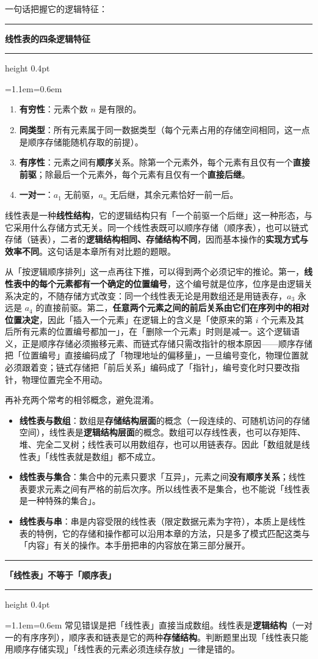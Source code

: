 \documentclass[11pt,openany,UTF8]{ctexbook}
\newcommand{\callouthead}[2]{%
  \par\addvspace{7pt}\noindent
  {\color{#1}\rule[-0.15em]{3pt}{1.05em}}\hspace{0.5em}%
  {\bfseries\color{#1}#2}\par\nobreak\vspace{-0.35em}%
  {\color{rulesep}\hrule height 0.4pt}\nobreak\vspace{0.45em}%
  \begingroup\small\setlength{\parindent}{0pt}%
  \leftskip=1.1em\rightskip=0.6em\noindent\ignorespaces}
\newcommand{\calloutend}{\par\endgroup\addvspace{7pt}}
\newenvironment{callkey}[1]{\callouthead{keybar}{#1}}{\calloutend}
\newenvironment{callwarn}[1]{\callouthead{warnbar}{#1}}{\calloutend}
\begin{document}
一句话把握它的逻辑特征：

\begin{callkey}{线性表的四条逻辑特征}
\begin{enumerate}
\item \textbf{有穷性}：元素个数 $n$ 是有限的。
\item \textbf{同类型}：所有元素属于同一数据类型（每个元素占用的存储空间相同，这一点是顺序存储能随机存取的前提）。
\item \textbf{有序性}：元素之间有\textbf{顺序}关系。除第一个元素外，每个元素有且仅有一个\textbf{直接前驱}；除最后一个元素外，每个元素有且仅有一个\textbf{直接后继}。
\item \textbf{一对一}：$a_1$ 无前驱，$a_n$ 无后继，其余元素恰好一前一后。
\end{enumerate}
\end{callkey}

线性表是一种\textbf{线性结构}，它的逻辑结构只有「一个前驱一个后继」这一种形态，与它采用什么存储方式无关。同一个线性表既可以顺序存储（顺序表），也可以链式存储（链表），二者的\textbf{逻辑结构相同、存储结构不同}，因而基本操作的\textbf{实现方式与效率不同}。这句话是本章所有对比题的题眼。

从「按逻辑顺序排列」这一点再往下推，可以得到两个必须记牢的推论。第一，\textbf{线性表中的每个元素都有一个确定的位置编号}，这个编号就是位序，位序是由逻辑关系决定的，不随存储方式改变：同一个线性表无论是用数组还是用链表存，$a_3$ 永远是 $a_4$ 的直接前驱。第二，\textbf{任意两个元素之间的前后关系由它们在序列中的相对位置决定}，因此「插入一个元素」在逻辑上的含义是「使原来的第 $i$ 个元素及其后所有元素的位置编号都加一」，在「删除一个元素」时则是减一。这个逻辑语义，正是顺序存储必须搬移元素、而链式存储只需改指针的根本原因——顺序存储把「位置编号」直接编码成了「物理地址的偏移量」，一旦编号变化，物理位置就必须跟着变；链式存储把「前后关系」编码成了「指针」，编号变化时只要改指针，物理位置完全不用动。

再补充两个常考的相邻概念，避免混淆。

\begin{itemize}
\item \textbf{线性表与数组}：数组是\textbf{存储结构层面}的概念（一段连续的、可随机访问的存储空间），线性表是\textbf{逻辑结构层面}的概念。数组可以存线性表，也可以存矩阵、堆、完全二叉树；线性表可以用数组存，也可以用链表存。因此「数组就是线性表」「线性表就是数组」都不成立。
\item \textbf{线性表与集合}：集合中的元素只要求「互异」，元素之间\textbf{没有顺序关系}；线性表要求元素之间有严格的前后次序。所以线性表不是集合，也不能说「线性表是一种特殊的集合」。
\item \textbf{线性表与串}：串是内容受限的线性表（限定数据元素为字符），本质上是线性表的特例，它的存储和操作都可以沿用本章的方法，只是多了模式匹配这类与「内容」有关的操作。本手册把串的内容放在第三部分展开。
\end{itemize}
\begin{callwarn}{「线性表」不等于「顺序表」}
常见错误是把「线性表」直接当成数组。线性表是\textbf{逻辑结构}（一对一的有序序列），顺序表和链表是它的两种\textbf{存储结构}。判断题里出现「线性表只能用顺序存储实现」「线性表的元素必须连续存放」一律是错的。

\end{callwarn}
\end{document}
